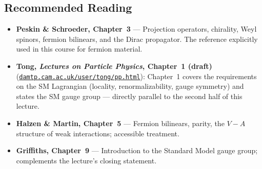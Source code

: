 \documentclass[../main.tex]{subfiles}
\begin{document}
\subsection*{Recommended Reading}

\begin{itemize}
  \item \textbf{Peskin \& Schroeder, Chapter~3} — Projection operators, chirality, Weyl spinors, fermion bilinears, and the Dirac propagator.  The reference explicitly used in this course for fermion material.

  \item \textbf{Tong, \textit{Lectures on Particle Physics}, Chapter~1 (draft)}
    (\href{https://www.damtp.cam.ac.uk/user/tong/pp.html}{\texttt{damtp.cam.ac.uk/user/tong/pp.html}}):
    Chapter~1 covers the requirements on the SM Lagrangian (locality, renormalizability, gauge symmetry) and states the SM gauge group — directly parallel to the second half of this lecture.

  \item \textbf{Halzen \& Martin, Chapter~5} — Fermion bilinears, parity, the $V-A$ structure of weak interactions; accessible treatment.

  \item \textbf{Griffiths, Chapter~9} — Introduction to the Standard Model gauge group; complements the lecture's closing statement.
\end{itemize}
\end{document}
